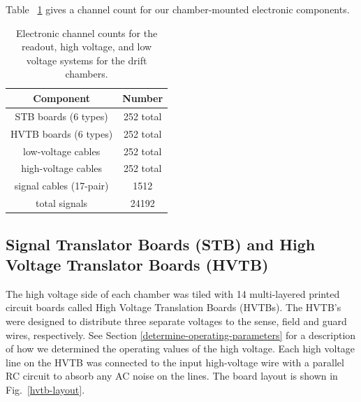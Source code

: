 Table ~\ref{electronic-components} gives a channel count for our chamber-mounted electronic components.
\begin{table}[htbp]
\begin{center}
\begin{tabular} {||c|c||} \hline \hline
{\bf Component}           & {\bf Number} \\ \hline
STB boards (6 types)      & 252 total \\ \hline
HVTB boards (6 types)     & 252 total \\ \hline
low-voltage cables        & 252 total  \\ \hline
high-voltage cables       & 252 total  \\ \hline
signal cables (17-pair)   & 1512 \\ \hline
total signals             & 24192 \\ \hline \hline
\end{tabular}
\caption{\small{Electronic channel counts for the readout, high voltage,
and low voltage systems for the drift chambers.}}
\label{electronic-components}
\end{center}
\end{table}

\subsection{Signal Translator Boards (STB) and High Voltage Translator Boards (HVTB)}

The high voltage side of each chamber was tiled with 14  multi-layered printed circuit 
boards called High Voltage Translation Boards (HVTBs).
The HVTB's were designed to distribute three separate voltages to the sense, field
and guard wires, respectively.  See Section \ref{determine-operating-parameters} for a 
description of how we determined the operating values of the high voltage.  
Each high voltage line on the HVTB was connected to the 
input high-voltage wire with a parallel RC circuit to absorb any AC noise on
the lines.  The board layout is shown in Fig.~\ref{hvtb-layout}.

